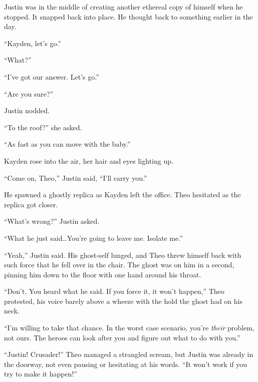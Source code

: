 Justin was in the middle of creating another ethereal copy of himself when he stopped.  It snapped back into place.  He thought back to something earlier in the day.



``Kayden, let's go.''



``What?''



``I've got our answer.  Let's go.''



``Are you sure?''



Justin nodded.



``To the roof?'' she asked.



``As fast as you can move with the baby.''



Kayden rose into the air, her hair and eyes lighting up.



``Come on, Theo,'' Justin said, ``I'll carry you.''



He spawned a ghostly replica as Kayden left the office.  Theo hesitated as the replica got closer.



``What's wrong?'' Justin asked.



``What he just said\ldots  You're going to leave me.  Isolate me.''



``Yeah,'' Justin said.  His ghost-self lunged, and Theo threw himself back with such force that he fell over in the chair.  The ghost was on him in a second, pinning him down to the floor with one hand around his throat.



``Don't.  You heard what he said.  If you force it, it won't happen,'' Theo protested, his voice barely above a wheeze with the hold the ghost had on his neck.



``I'm willing to take that chance.  In the worst case scenario, you're \emph{their} problem, not ours.  The heroes can look after you and figure out what to do with you.''



``Justin!  Crusader!''  Theo managed a strangled scream, but Justin was already in the doorway, not even pausing or hesitating at his words.  ``It won't work if you try to make it happen!''



